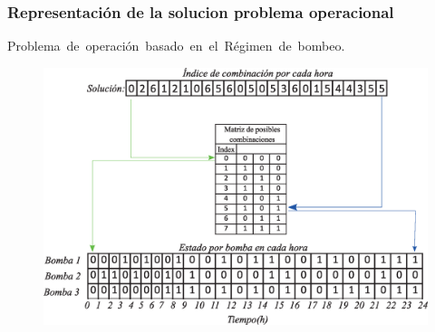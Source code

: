 \documentclass[9pt]{beamer}
\begin{document}
    \begin{frame}
        \frametitle{Representación de la solucion problema operacional}
        Problema de operación basado en el Régimen de bombeo.
        \begin{figure}
            \includegraphics[scale=0.3]{assets/Anexo/representacion_solucion_multiobjetivo.eps}
        \end{figure}

    \end{frame}
\end{document}
